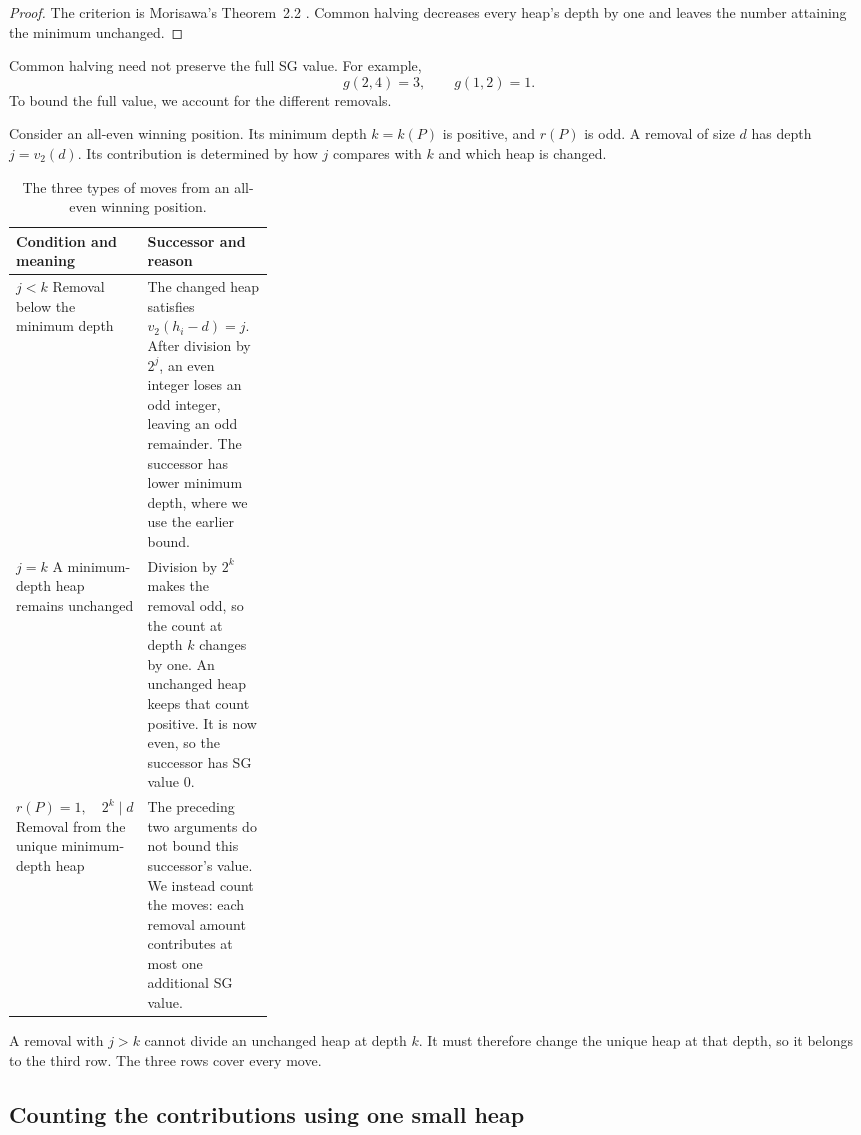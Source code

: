 \documentclass[10pt,a4paper]{article}
\begin{document}
\begin{proof}
The criterion is Morisawa's Theorem~2.2
\cite{Morisawa2026}. Common halving decreases every heap's
depth by one and leaves the number attaining the minimum
unchanged.
\end{proof}

Common halving need not preserve the full SG value. For example,
\[
 g(2,4)=3,
 \qquad
 g(1,2)=1.
\]
To bound the full value, we account for the different removals.

Consider an all-even winning position. Its minimum depth
$k=k(P)$ is positive, and $r(P)$ is odd. A removal of size
$d$ has depth $j=v_2(d)$. Its contribution is determined by
how $j$ compares with $k$ and which heap is changed.

\begin{table}[H]
\centering
\begin{tabularx}{\linewidth}{@{}L{0.30\linewidth}Y@{}}
\toprule
Condition and meaning & Successor and reason \\
\midrule
$j<k$\newline
Removal below the minimum depth
  & The changed heap satisfies $v_2(h_i-d)=j$.
    After division by $2^j$, an even integer loses an odd
    integer, leaving an odd remainder. The successor has
    lower minimum depth, where we use the earlier bound. \\
\addlinespace[9pt]
$j=k$\newline
A minimum-depth heap remains unchanged
  & Division by $2^k$ makes the removal odd, so the count
    at depth $k$ changes by one. An unchanged heap keeps
    that count positive. It is now even, so the successor
    has SG value $0$. \\
\addlinespace[9pt]
$r(P)=1,\quad 2^k\mid d$\newline
Removal from the unique minimum-depth heap
  & The preceding two arguments do not bound this successor's
    value. We instead count the moves: each removal amount
    contributes at most one additional SG value. \\
\bottomrule
\end{tabularx}
\caption{The three types of moves from an all-even winning position.}
\label{tab:moves}
\end{table}

A removal with $j>k$ cannot divide an unchanged heap at depth
$k$. It must therefore change the unique heap at that depth,
so it belongs to the third row. The three rows cover every move.

\subsection{Counting the contributions using one small heap}
\end{document}
